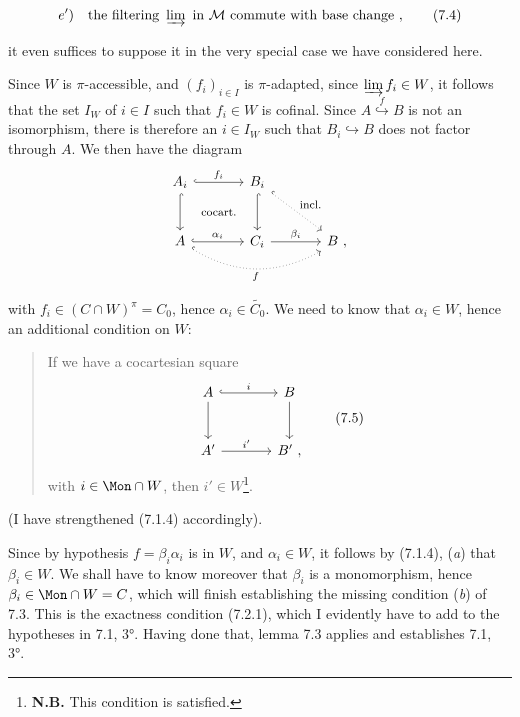 \[
e')\quad \text{the filtering } \varinjlim \text{ in } \mathcal{M} \text{ commute with base change}\ , \tag*{(7.4)}
\]

it even suffices to suppose it in the very special case we have considered here.

Since $W$ is $\pi$-accessible, and $(f_i)_{i \in I}$ is $\pi$-adapted, since $\varinjlim f_i \in W$, it follows that the set $I_W$ of $i \in I$ such that $f_i \in W$ is cofinal. Since $A \overset{f}{\hookrightarrow} B$ is not an isomorphism, there is therefore an $i \in I_W$ such that $B_i \hookrightarrow B$ does not factor through $A$. We then have the diagram
\[
\begin{tikzcd}[row sep=large, column sep=large]
A_i \arrow[r, hook, "f_i"] \arrow[d, hook] \arrow[rd, phantom, "\text{\footnotesize cocart.}"] & B_i \arrow[d, hook] \arrow[rd, dotted, hook, "\text{\footnotesize incl.}"] & \\
A \arrow[r, hook, "\alpha_i"] \arrow[rr, dotted, hook, bend right, "f"'] & C_i \arrow[r, "\beta_i"] & B \ ,
\end{tikzcd}
\]

with $f_i \in (C \cap W)^{\pi} = C_0$, hence $\alpha_i \in \widetilde{C_0}$. We need to know that $\alpha_i \in W$, hence an additional condition on $W$:

\begin{quote}
If we have a cocartesian square
\[
\begin{tikzcd}[row sep=large, column sep=large]
A \arrow[r, hook, "i"] \arrow[d] & B \arrow[d] \\
A' \arrow[r, "{i'}"] & B' \ ,
\end{tikzcd}
\tag*{(7.5)}
\]
with $i \in \Mon \cap W$, then $i' \in W$\footnote[34]{\textbf{N.B.} This condition is satisfied.}.
\end{quote}

(I have strengthened (7.1.4) accordingly).


Since by hypothesis $f = \beta_i \alpha_i$ is in $W$, and $\alpha_i \in W$, it follows by (7.1.4), (\textit{a}) that $\beta_i \in W$. We shall have to know moreover that $\beta_i$ is a monomorphism, hence $\beta_i \in \Mon \cap W = C$, which will finish establishing the missing condition (\textit{b}) of 7.3. This is the exactness condition (7.2.1), which I evidently have to add to the hypotheses in 7.1, 3°. Having done that, lemma 7.3 applies and establishes 7.1, 3°.

